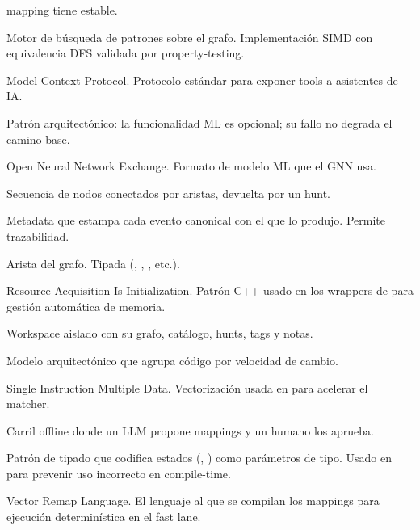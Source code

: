 \begin{description}
    mapping tiene  estable.
    \item[Matcher] Motor de búsqueda de patrones sobre el grafo.
    Implementación SIMD con equivalencia DFS validada por
    property-testing.
    \item[MCP] Model Context Protocol. Protocolo estándar para
    exponer tools a asistentes de IA.
    \item[Model gate] Patrón arquitectónico: la funcionalidad ML
    es opcional; su fallo no degrada el camino base.
    \item[ONNX] Open Neural Network Exchange. Formato de modelo ML
    que el GNN usa.
    \item[Path] Secuencia de nodos conectados por aristas,
    devuelta por un hunt.
    \item[Provenance] Metadata que estampa cada evento canonical
    con el  que lo produjo. Permite
    trazabilidad.
    \item[Relación] Arista del grafo. Tipada (,
    , , etc.).
    \item[RAII] Resource Acquisition Is Initialization. Patrón C++
    usado en los wrappers de  para
    gestión automática de memoria.
    \item[Sesión] Workspace aislado con su grafo, catálogo,
    hunts, tags y notas.
    \item[Shearing layers] Modelo arquitectónico que agrupa código
    por velocidad de cambio.
    \item[SIMD] Single Instruction Multiple Data. Vectorización
    usada en  para acelerar el matcher.
    \item[Slow lane] Carril offline donde un LLM propone mappings
    y un humano los aprueba.
    \item[Typestate] Patrón de tipado que codifica estados
    (, ) como parámetros de tipo.
    Usado en  para prevenir uso incorrecto en
    compile-time.
    \item[VRL] Vector Remap Language. El lenguaje al que se
    compilan los mappings para ejecución determinística en el fast
    lane.
\end{description}
